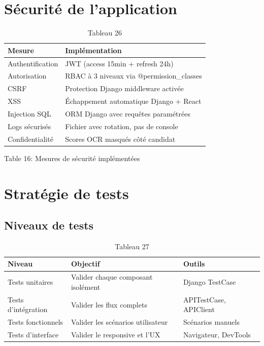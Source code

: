 \section{Sécurité de l'application}

\begin{table}[htbp]
\centering
\begin{tabular}{|l|l|}
\hline
Mesure & Implémentation \\
\hline
Authentification & JWT (access 15min + refresh 24h) \\
\hline
Autorisation & RBAC à 3 niveaux via @permission\_classes \\
\hline
CSRF & Protection Django middleware activée \\
\hline
XSS & Échappement automatique Django + React \\
\hline
Injection SQL & ORM Django avec requêtes paramétrées \\
\hline
Logs sécurisés & Fichier avec rotation, pas de console \\
\hline
Confidentialité & Scores OCR masqués côté candidat \\
\hline
\end{tabular}
\caption{Tableau 26}
\label{tab:table_26}
\end{table}

Table 16: Mesures de sécurité implémentées

\section{Stratégie de tests}

\subsection{Niveaux de tests}

\begin{table}[htbp]
\centering
\begin{tabular}{|l|l|l|}
\hline
Niveau & Objectif & Outils \\
\hline
Tests unitaires & Valider chaque composant isolément & Django TestCase \\
\hline
Tests d'intégration & Valider les flux complets & APITestCase, APIClient \\
\hline
Tests fonctionnels & Valider les scénarios utilisateur & Scénarios manuels \\
\hline
Tests d'interface & Valider le responsive et l'UX & Navigateur, DevTools \\
\hline
\end{tabular}
\caption{Tableau 27}
\label{tab:table_27}
\end{table}

